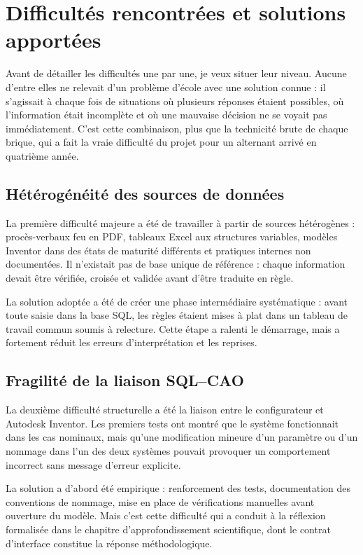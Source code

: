 \section{Difficultés rencontrées et solutions apportées}

Avant de détailler les difficultés une par une, je veux situer leur niveau. Aucune d'entre elles ne relevait d'un problème d'école avec une solution connue : il s'agissait à chaque fois de situations où plusieurs réponses étaient possibles, où l'information était incomplète et où une mauvaise décision ne se voyait pas immédiatement. C'est cette combinaison, plus que la technicité brute de chaque brique, qui a fait la vraie difficulté du projet pour un alternant arrivé en quatrième année.

\subsection{Hétérogénéité des sources de données}

La première difficulté majeure a été de travailler à partir de sources hétérogènes : procès-verbaux feu en PDF, tableaux Excel aux structures variables, modèles Inventor dans des états de maturité différents et pratiques internes non documentées. Il n'existait pas de base unique de référence : chaque information devait être vérifiée, croisée et validée avant d'être traduite en règle.

La solution adoptée a été de créer une phase intermédiaire systématique : avant toute saisie dans la base SQL, les règles étaient mises à plat dans un tableau de travail commun soumis à relecture. Cette étape a ralenti le démarrage, mais a fortement réduit les erreurs d'interprétation et les reprises.

\subsection{Fragilité de la liaison SQL--CAO}

La deuxième difficulté structurelle a été la liaison entre le configurateur et Autodesk Inventor. Les premiers tests ont montré que le système fonctionnait dans les cas nominaux, mais qu'une modification mineure d'un paramètre ou d'un nommage dans l'un des deux systèmes pouvait provoquer un comportement incorrect sans message d'erreur explicite.

La solution a d'abord été empirique : renforcement des tests, documentation des conventions de nommage, mise en place de vérifications manuelles avant ouverture du modèle. Mais c'est cette difficulté qui a conduit à la réflexion formalisée dans le chapitre d'approfondissement scientifique, dont le contrat d'interface constitue la réponse méthodologique.

